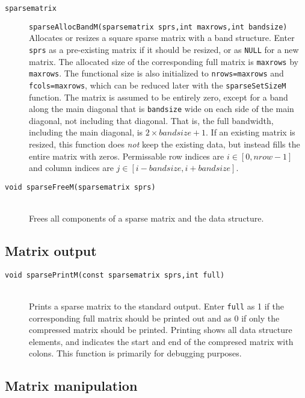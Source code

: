 \documentclass[11pt]{article}
\newcommand {\ttt} {\texttt}
\begin{document}
\begin{description}


\item[\ttt{sparsematrix}]
\ttt{sparseAllocBandM(sparsematrix sprs,int maxrows,int bandsize)}
\hfill \\
Allocates or resizes a square sparse matrix with a band structure. Enter \ttt{sprs} as a pre-existing matrix if it should be resized, or as \ttt{NULL} for a new matrix. The allocated size of the corresponding full matrix is \ttt{maxrows} by \ttt{maxrows}. The functional size is also initialized to \ttt{nrows=maxrows} and \ttt{fcols=maxrows}, which can be reduced later with the \ttt{sparseSetSizeM} function. The matrix is assumed to be entirely zero, except for a band along the main diagonal that is \ttt{bandsize} wide on each side of the main diagonal, not including that diagonal. That is, the full bandwidth, including the main diagonal, is $2 \times bandsize+1$. If an existing matrix is resized, this function does \textit{not} keep the existing data, but instead fills the entire matrix with zeros. Permissable row indices are $i \in [0,nrow-1]$ and column indices are $j \in [i-bandsize,i+bandsize]$.

\item[\ttt{void sparseFreeM(sparsematrix sprs)}]
\hfill \\
Frees all components of a sparse matrix and the data structure.

\end{description}

\subsection{Matrix output}

\begin{description}

\item[\ttt{void sparsePrintM(const sparsematrix sprs,int full)}]
\hfill \\
Prints a sparse matrix to the standard output. Enter \ttt{full} as 1 if the corresponding full matrix should be printed out and as 0 if only the compressed matrix should be printed. Printing shows all data structure elements, and indicates the start and end of the compresed matrix with colons. This function is primarily for debugging purposes.

\end{description}

\subsection{Matrix manipulation}
\end{document}

